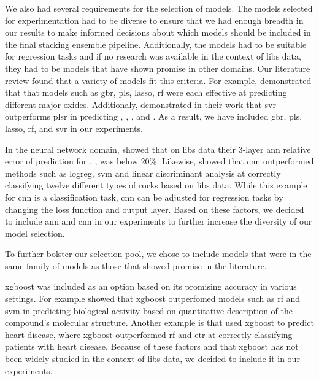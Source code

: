 We also had several requirements for the selection of models.
The models selected for experimentation had to be diverse to ensure that we had enough breadth in our results to make informed decisions about which models should be included in the final stacking ensemble pipeline.
Additionally, the models had to be suitable for regression tasks and if no research was available in the context of \gls{libs} data, they had to be models that have shown promise in other domains.
Our literature review found that a variety of models fit this criteria.
For example, \citet{andersonPostlandingMajorElement2022} demonstrated that that models such as \gls{gbr}, \gls{pls}, \gls{lasso}, \gls{rf} were each effective at predicting different major oxides.
Additionaly, \citet{svrforlibs} demonstrated in their work that \gls{svr} outperforms \gls{plsr} in predicting , , ,  and .
As a result, we have included \gls{gbr}, \gls{pls}, \gls{lasso}, \gls{rf}, and \gls{svr} in our experiments.

In the neural network domain, \cite{ann_libs_soil_analysis} showed that on \gls{libs} data their 3-layer \gls{ann} relative error of prediction for , ,  was below 20\%.
Likewise, \citet{yangConvolutionalNeuralNetwork2022} showed that \gls{cnn} outperformed methods such as \gls{logreg}, \gls{svm} and linear discriminant analysis at correctly classifying twelve different types of rocks based on \gls{libs} data. 
While this example for \gls{cnn} is a classification task, \gls{cnn} can be adjusted for regression tasks by changing the loss function and output layer.
Based on these factors, we decided to include \gls{ann} and \gls{cnn} in our experiments to further increase the diversity of our model selection.

To further bolster our selection pool, we chose to include models that were in the same family of models as those that showed promise in the literature.

\gls{xgboost} was included as an option based on its promising accuracy in various settings.
For example \citet{xgboost_in_biomedicie} showed that \gls{xgboost} outperfomed models such as \gls{rf} and \gls{svm} in predicting biological activity based on quantitative description of the compound's molecular structure. 
Another example is \citet{xgboost_in_heart_disease} that used \gls{xgboost} to predict heart disease, where \gls{xgboost} outperformed \gls{rf} and \gls{etr} at correctly classifying patients with heart disease.
Because of these factors and that \gls{xgboost} has not been widely studied in the context of \gls{libs} data, we decided to include it in our experiments.


